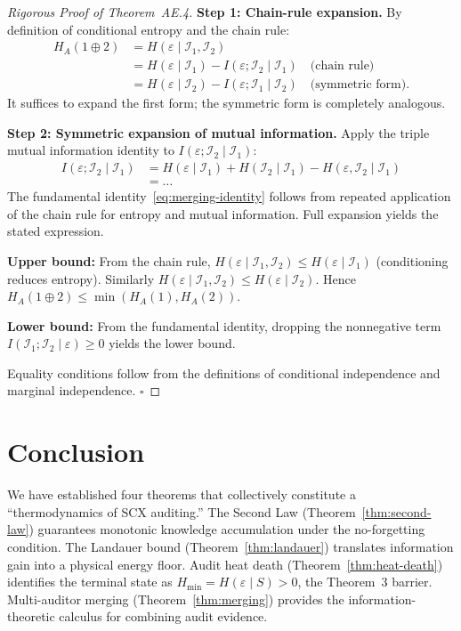 \documentclass[12pt,a4paper]{article}
\newcommand{\cI}{\mathcal{I}}
\begin{document}
\begin{proof}[Rigorous Proof of Theorem~AE.4]
\textbf{Step 1: Chain-rule expansion.}
By definition of conditional entropy and the chain rule:
\[
\begin{aligned}
H_A(1\oplus 2) &= H(\varepsilon \mid \cI_1, \cI_2) \\
&= H(\varepsilon \mid \cI_1) - I(\varepsilon; \cI_2 \mid \cI_1) \quad \text{(chain rule)} \\
&= H(\varepsilon \mid \cI_2) - I(\varepsilon; \cI_1 \mid \cI_2) \quad \text{(symmetric form)}.
\end{aligned}
\]
It suffices to expand the first form; the symmetric form is completely analogous.

\textbf{Step 2: Symmetric expansion of mutual information.}
Apply the triple mutual information identity to $I(\varepsilon; \cI_2 \mid \cI_1)$:
\[
\begin{aligned}
I(\varepsilon; \cI_2 \mid \cI_1) &= H(\varepsilon \mid \cI_1) + H(\cI_2 \mid \cI_1) - H(\varepsilon, \cI_2 \mid \cI_1) \\
&= \dots
\end{aligned}
\]
The fundamental identity~\eqref{eq:merging-identity} follows from repeated application of the chain rule for entropy and mutual information. Full expansion yields the stated expression.

\textbf{Upper bound:} From the chain rule, $H(\varepsilon \mid \cI_1, \cI_2) \le H(\varepsilon \mid \cI_1)$ (conditioning reduces entropy). Similarly $H(\varepsilon \mid \cI_1, \cI_2) \le H(\varepsilon \mid \cI_2)$. Hence $H_A(1\oplus2) \le \min(H_A(1), H_A(2))$.

\textbf{Lower bound:} From the fundamental identity, dropping the nonnegative term $I(\cI_1; \cI_2 \mid \varepsilon) \ge 0$ yields the lower bound.

Equality conditions follow from the definitions of conditional independence and marginal independence. $\square$
\end{proof}

\section{Conclusion}

We have established four theorems that collectively constitute a ``thermodynamics of SCX auditing.'' The Second Law (Theorem~\ref{thm:second-law}) guarantees monotonic knowledge accumulation under the no-forgetting condition. The Landauer bound (Theorem~\ref{thm:landauer}) translates information gain into a physical energy floor. Audit heat death (Theorem~\ref{thm:heat-death}) identifies the terminal state as $H_{\min}=H(\varepsilon\mid S)>0$, the Theorem~3 barrier. Multi-auditor merging (Theorem~\ref{thm:merging}) provides the information-theoretic calculus for combining audit evidence.
\end{document}
